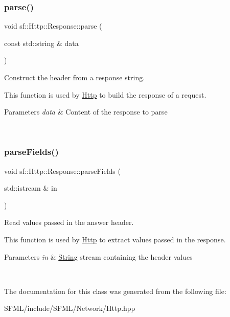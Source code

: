 \subsubsection{\texorpdfstring{parse()}{parse()}}
{\footnotesize\ttfamily void sf\+::\+Http\+::\+Response\+::parse (\begin{DoxyParamCaption}\item[{const std\+::string \&}]{data }\end{DoxyParamCaption})\hspace{0.3cm}{\ttfamily [private]}}



Construct the header from a response string. 

This function is used by \mbox{\hyperlink{classsf_1_1_http}{Http}} to build the response of a request.


\begin{DoxyParams}{Parameters}
{\em data} & Content of the response to parse \begin{DoxyVerb}\end{DoxyVerb}
 \\
\hline
\end{DoxyParams}
\mbox{\label{classsf_1_1_http_1_1_response_a545515d6e68a5ce179e522aad427c7ef}} 
\subsubsection{\texorpdfstring{parseFields()}{parseFields()}}
{\footnotesize\ttfamily void sf\+::\+Http\+::\+Response\+::parse\+Fields (\begin{DoxyParamCaption}\item[{std\+::istream \&}]{in }\end{DoxyParamCaption})\hspace{0.3cm}{\ttfamily [private]}}



Read values passed in the answer header. 

This function is used by \mbox{\hyperlink{classsf_1_1_http}{Http}} to extract values passed in the response.


\begin{DoxyParams}{Parameters}
{\em in} & \mbox{\hyperlink{classsf_1_1_string}{String}} stream containing the header values \begin{DoxyVerb}\end{DoxyVerb}
 \\
\hline
\end{DoxyParams}


The documentation for this class was generated from the following file\+:\begin{DoxyCompactItemize}
\item 
S\+F\+M\+L/include/\+S\+F\+M\+L/\+Network/Http.\+hpp\end{DoxyCompactItemize}
